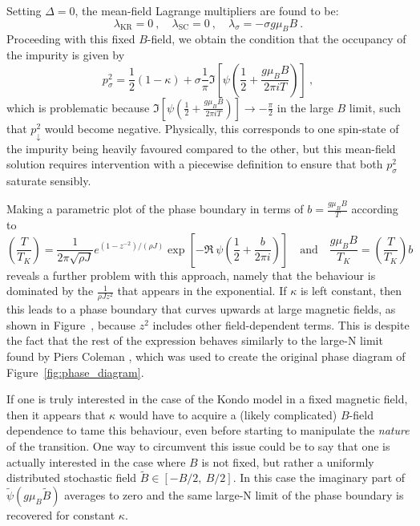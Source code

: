 Setting $ \Delta = 0 $, the mean-field Lagrange multipliers are found to be:
\begin{equation}
\lambda_{\text{KR}} = 0 ~, \quad \lambda_{\text{SC}} = 0 ~,
\quad \lambda_{\sigma} = - \sigma g \mu_{B} B ~.
\end{equation}
Proceeding with this fixed $ B $-field, we obtain the condition that the occupancy of the impurity is given by
\begin{equation}
p^2_{\sigma} = \frac{1}{2} ( 1 - \kappa ) + \sigma \frac{1}{\pi} \Im{\left[ \psi\left( \frac{1}{2} + \frac{g \mu_B B}{2 \pi i T} \right) \right]} ~,
\end{equation}
which is problematic because $ \Im{\left[ \psi\left( \frac{1}{2} + \frac{g \mu_B B}{2 \pi i T} \right) \right]} \rightarrow - \frac{\pi}{2} $ in the large $ B $ limit, such that $ p^2_{\downarrow} $ would become negative. Physically, this corresponds to one spin-state of the impurity being heavily favoured compared to the other, but this mean-field solution requires intervention with a piecewise definition to ensure that both $ p^2_{\sigma} $ saturate sensibly.

Making a parametric plot of the phase boundary in terms of $ b = \frac{g \mu_B B}{T} $ according to
\begin{equation}
\left( \frac{T}{T_K} \right) = \frac{1}{2 \pi \sqrt{\rho J}} e^{\left( 1 - z^{-2} \right) / (\rho J)} \exp{\left[ - \Re ~ \psi \left( \frac{1}{2} + \frac{b}{2 \pi i} \right) \right]} \quad \text{and} \quad \frac{g \mu_B B}{T_K} = \left( \frac{T}{T_K} \right) b
\end{equation}
reveals a further problem with this approach, namely that the behaviour is dominated by the $ \frac{1}{\rho J z^2} $ that appears in the exponential. If $ \kappa $ is left constant, then this leads to a phase boundary that curves upwards at large magnetic fields, as shown in Figure~, because $ z^2 $ includes other field-dependent terms. This is despite the fact that the rest of the expression behaves similarly to the large-N limit found by Piers Coleman \cite{ManyBodyPhysics}, which was used to create the original phase diagram of Figure~\ref{fig:phase_diagram}.

If one is truly interested in the case of the Kondo model in a fixed magnetic field, then it appears that $ \kappa $ would have to acquire a (likely complicated) $B$-field dependence to tame this behaviour, even before starting to manipulate the \emph{nature} of the transition. One way to circumvent this issue could be to say that one is actually interested in the case where $ B $ is not fixed, but rather a uniformly distributed stochastic field $ \widetilde{B} \in [ - B / 2, ~ B / 2 ] $. In this case the imaginary part of $ \widetilde{\psi} (g \mu_B \widetilde{B}) $ averages to zero and the same large-N limit of the phase boundary is recovered for constant $ \kappa $. 

